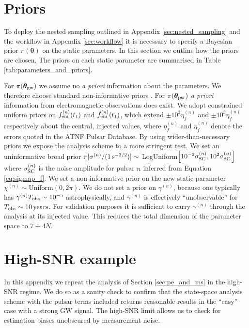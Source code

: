 \documentclass[fleqn,usenatbib,useAMS]{mnras}
\begin{document}
\section{Priors}\label{sec:set_priors}
To deploy the nested sampling outlined in Appendix \ref{sec:nested_sampling} and the workflow in Appendix \ref{sec:workflow} it is necessary to specify a Bayesian prior $\pi(\boldsymbol{\theta})$ on the static parameters. In this section we outline how the priors are chosen. The priors on each static parameter are summarised in Table \ref{tab:parameters_and_priors}.  \newline 

For $\pi(\boldsymbol{\theta}_{\rm gw})$ we assume no \textit{a priori} information about the parameters. We therefore choose standard non-informative priors \citep[e.g.][]{Bhagwat2021}. For $\pi(\boldsymbol{\theta}_{\rm psr})$ \textit{a priori} information from electromagnetic observations does exist. We adopt constrained uniform priors on $f_{\rm em}^{(n)}(t_1)$ and $\dot{f}_{\rm em}^{(n)}(t_1)$, which extend $\pm 10^3 \eta_f^{(n)}$ and $\pm 10^3 \eta_{\dot{f}}^{(n)}$ respectively about the central, injected values, where $\eta_f^{(n)}$ and $\eta_{\dot{f}}^{(n)}$ denote the errors quoted in the ATNF Pulsar Database. By using wider-than-necessary priors we expose the analysis scheme to a more stringent test. We set an uninformative broad prior $\pi[\sigma^{(n)} / (1 \, {\rm s^{-3/2}})] \sim$ LogUniform$ \left [10^{-2} \sigma_{\rm SC}^{(n)}, 10^2 \sigma_{\rm SC}^{(n)} \right ]$
where $\sigma_{\rm SC}^{(n)}$ is the noise amplitude for pulsar $n$ inferred from
Equation \eqref{eq:sigmap_f}. We set a non-informative prior on the new static parameter $\chi^{(n)} \sim \text{Uniform}\left(0,2\pi\right)$. We do not set a prior on $\gamma^{(n)}$, because one typically has $\gamma^{(n)} T_{\rm obs} \sim 10^{-5}$ astrophysically, and $\gamma^{(n)}$ is effectively ``unobservable'' for $T_{\rm obs} \sim 10 \, {\rm years}$. For validation purposes it is sufficient to carry $\gamma^{(n)}$ through the analysis at its injected value. This reduces the total dimension of the parameter space to $7 + 4N$. \newline 




\section{High-SNR example} \label{sec:app_high_SNR}
In this appendix we repeat the analysis of Section \ref{sec:pe_and_ms} in the high-SNR regime. We do so as a sanity check to confirm that the state-space analysis scheme with the pulsar terms included returns reasonable results in the ``easy'' case with a strong GW signal. The high-SNR limit allows us to check for estimation biases unobscured by measurement noise. \newline 
\end{document}
